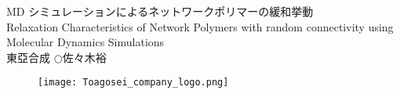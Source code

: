 \begin{minipage}[]{0.85\columnwidth}
	\centering
		\LARGE MD シミュレーションによるネットワークポリマーの緩和挙動  \\
		\large Relaxation Characteristics of Network Polymers with random connectivity using Molecular Dynamics Simulations\\[10mm]
		東亞合成 $\bigcirc$佐々木裕 \\
\end{minipage}
\begin{minipage}[]{0.14\columnwidth}
	\begin{figure}\centering
		\texttt{[image: Toagosei\_company\_logo.png]}
	\end{figure}
\end{minipage}